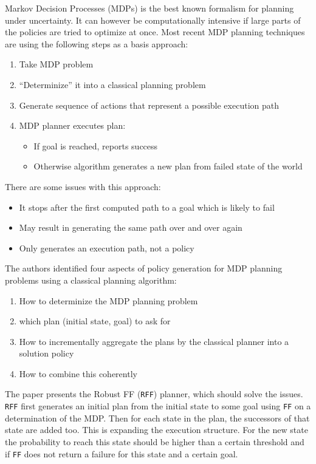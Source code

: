 \documentclass[runningheads,a4paper]{llncs}
\begin{document}
Markov Decision Processes (MDPs) is the best known formalism for planning under
uncertainty. It can however be computationally intensive if large parts of the
policies are tried to optimize at once. Most recent MDP planning techniques are
using the following steps as a basis approach:

\begin{enumerate}
	\item Take MDP problem
	\item ``Determinize''  it into a classical planning problem
	\item Generate sequence of actions that represent a possible execution
		path
	\item MDP planner executes plan:
		\begin{itemize}
			\item If goal is reached, reports success
			\item Otherwise algorithm generates a new plan from failed state of
				the world
		\end{itemize}
\end{enumerate}

There are some issues with this approach:

\begin{itemize}
	\item It stops after the first computed path to a goal which is likely to fail
	\item May result in generating the same path over and over again
	\item Only generates an execution path, not a policy
\end{itemize}

The authors identified four aspects of policy generation for MDP planning
problems using a classical planning algorithm:

\begin{enumerate}
	\item How to determinize the MDP planning problem
	\item which plan (initial state, goal) to ask for
	\item How to incrementally aggregate the plans by the classical planner
		into a solution policy
	\item How to combine this coherently
\end{enumerate}

The paper presents the Robust FF (\texttt{RFF}) planner, which should solve the
issues. \texttt{RFF} first generates an initial plan from the initial state to
some goal using \texttt{FF} on a determination of the MDP\@. Then for each
state in the plan, the successors of that state are added too. This is
expanding the execution structure. For the new state the probability to reach
this state should be higher than a certain threshold and if \texttt{FF} does
not return a failure for this state and a certain goal.
\end{document}
